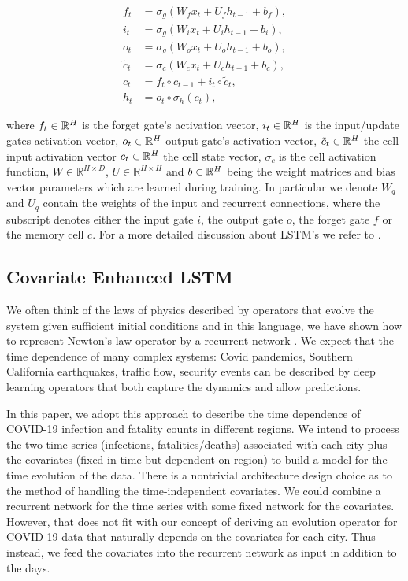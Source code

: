 \documentclass[a4paper, inpress]{jds} %
\renewcommand{\_}{%
    \textunderscore\hspace{0pt}%
}
\begin{document}
\begin{align}
    f_t &= \sigma_g(W_f x_t + U_f h_{t-1} + b_f), \label{eq:first} \\
    i_t &= \sigma_g(W_i x_t + U_i h_{t-1} + b_i), \\
    o_t &= \sigma_g(W_o x_t + U_o h_{t-1} + b_o), \\
    \tilde{c}_t &= \sigma_c(W_c x_t + U_c h_{t-1} + b_c), \\
    c_t &= f_t \circ c_{t-1} +i_t \circ \tilde{c}_t,  \\
    h_t &= o_t \circ \sigma_h(c_t) \label{eq:last},
\end{align}

where 
$f_t \in \mathbb{R}^{H}$ is the forget gate's activation vector, 
$i_t \in \mathbb{R}^{H}$ is the input/update gates activation vector, 
$o_{t}\in \mathbb{R}^{H}$ output gate's activation vector, 
$\tilde{c}_{t}\in \mathbb{R}^{H}$ the cell input activation vector
$c_{t}\in \mathbb{R}^{H}$ the cell state vector,  
$\sigma_c$ is the cell activation function,
$W\in \mathbb {R} ^{H\times D}$,
$U\in \mathbb {R} ^{H\times H}$ and
$b\in \mathbb{R}^{H}$ being the weight matrices and bias vector parameters which
are learned during training.  In particular we denote $W_{q}$ and
$U_{q}$ contain the weights of the input and recurrent connections,
where the subscript denotes either the input gate $i$, the output gate
$o$, the forget gate $f$ or the memory cell $c$. For a more detailed
discussion about LSTM's we refer to \cite{lstm-explained}.



\subsection{Covariate Enhanced LSTM}

We often think of the laws of physics described by operators that
evolve the system given sufficient initial conditions and in this
language, we have shown how to represent Newton’s law operator by a
recurrent network \citep{Kadupitiya2020-zq}. We expect that the time
dependence of many complex systems: Covid pandemics, Southern
California earthquakes, traffic flow, security events can be described
by deep learning operators that both capture the dynamics and allow
predictions. 

In this paper, we adopt this approach to describe the time dependence
of COVID-19 infection and fatality counts in different regions.  We
intend to process the two time-series (infections, fatalities/deaths)
associated with each city plus the covariates (fixed in time but
dependent on region) to build a model for the time evolution of the
data. There is a nontrivial architecture design choice as to the
method of handling the time-independent covariates. We could combine a
recurrent network for the time series with some fixed network for the
covariates. However, that does not fit with our concept of deriving an
evolution operator for COVID-19 data that naturally depends on the
covariates for each city. Thus instead, we feed the covariates into
the recurrent network as input in addition to the days.
\end{document}
